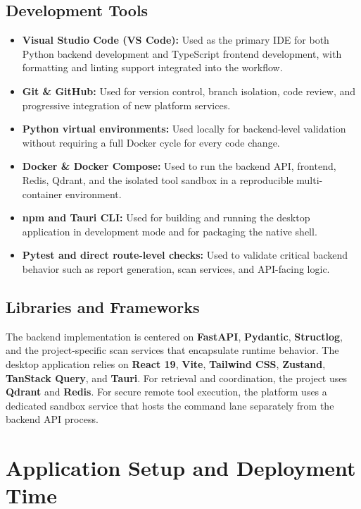 \documentclass[12pt,a4paper]{report}
\begin{document}
\subsection{Development Tools}
\begin{itemize}
    \item \textbf{Visual Studio Code (VS Code):} Used as the primary IDE for both
    Python backend development and TypeScript frontend development, with formatting
    and linting support integrated into the workflow.
    \item \textbf{Git \& GitHub:} Used for version control, branch isolation, code
    review, and progressive integration of new platform services.
    \item \textbf{Python virtual environments:} Used locally for backend-level
    validation without requiring a full Docker cycle for every code change.
    \item \textbf{Docker \& Docker Compose:} Used to run the backend API, frontend,
    Redis, Qdrant, and the isolated tool sandbox in a reproducible multi-container
    environment.
    \item \textbf{npm and Tauri CLI:} Used for building and running the desktop
    application in development mode and for packaging the native shell.
    \item \textbf{Pytest and direct route-level checks:} Used to validate critical
    backend behavior such as report generation, scan services, and API-facing logic.
\end{itemize}

\subsection{Libraries and Frameworks}
The backend implementation is centered on \textbf{FastAPI}, \textbf{Pydantic},
\textbf{Structlog}, and the project-specific scan services that encapsulate runtime
behavior. The desktop application relies on \textbf{React 19}, \textbf{Vite},
\textbf{Tailwind CSS}, \textbf{Zustand}, \textbf{TanStack Query}, and \textbf{Tauri}.
For retrieval and coordination, the project uses \textbf{Qdrant} and \textbf{Redis}.
For secure remote tool execution, the platform uses a dedicated sandbox service that
hosts the command lane separately from the backend API process.

\section{Application Setup and Deployment Time}
\end{document}
